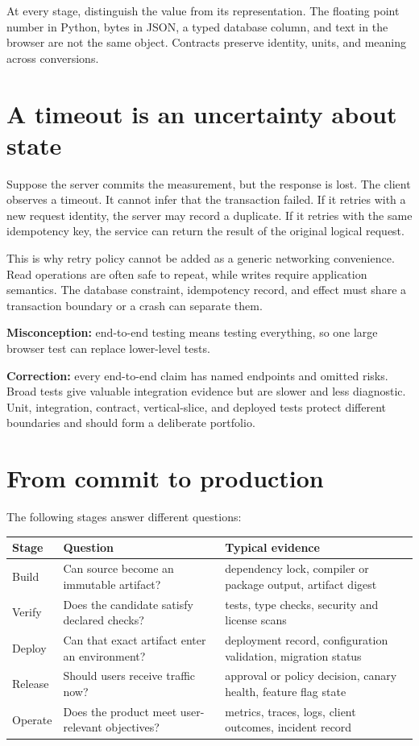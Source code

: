 At every stage, distinguish the value from its representation. The floating
point number in Python, bytes in JSON, a typed database column, and text in the
browser are not the same object. Contracts preserve identity, units, and
meaning across conversions.

\section{A timeout is an uncertainty about state}

Suppose the server commits the measurement, but the response is lost. The
client observes a timeout. It cannot infer that the transaction failed. If it
retries with a new request identity, the server may record a duplicate. If it
retries with the same idempotency key, the service can return the result of the
original logical request.

This is why retry policy cannot be added as a generic networking convenience.
Read operations are often safe to repeat, while writes require application
semantics. The database constraint, idempotency record, and effect must share a
transaction boundary or a crash can separate them.

\begin{misconceptionbox}
\textbf{Misconception:} end-to-end testing means testing everything, so one
large browser test can replace lower-level tests.

\textbf{Correction:} every end-to-end claim has named endpoints and omitted
risks. Broad tests give valuable integration evidence but are slower and less
diagnostic. Unit, integration, contract, vertical-slice, and deployed tests
protect different boundaries and should form a deliberate portfolio.
\end{misconceptionbox}

\section{From commit to production}

The following stages answer different questions:

\begin{longtable}{@{}p{}p{}p{}@{}}
\toprule
\textbf{Stage} & \textbf{Question} & \textbf{Typical evidence} \\
\midrule
\endhead
Build & Can source become an immutable artifact? & dependency lock, compiler or
package output, artifact digest \\
Verify & Does the candidate satisfy declared checks? & tests, type checks,
security and license scans \\
Deploy & Can that exact artifact enter an environment? & deployment record,
configuration validation, migration status \\
Release & Should users receive traffic now? & approval or policy decision,
canary health, feature flag state \\
Operate & Does the product meet user-relevant objectives? & metrics, traces,
logs, client outcomes, incident record \\
\bottomrule
\end{longtable}

